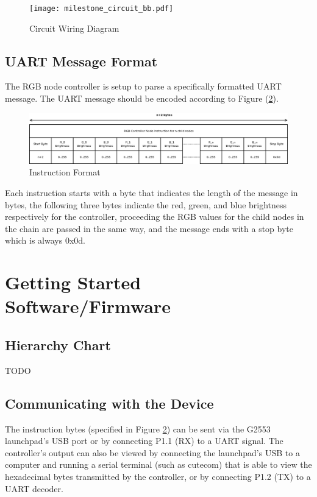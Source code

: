 \documentclass{hitec}
\begin{document}
\begin{figure}[H]
    \centering
    \texttt{[image: milestone\_circuit\_bb.pdf]}
    \caption{Circuit Wiring Diagram}
    \label{fig:circuit_bb}
\end{figure}


\subsection{UART Message Format}
The RGB node controller is setup to parse a specifically formatted UART message. The UART message should be encoded according to Figure (\ref{fig:instruction_format}).

\begin{figure}[H]
    \centering
    \includegraphics[scale=0.3]{instruction_format.png}
    \caption{Instruction Format}
    \label{fig:instruction_format}
\end{figure}

Each instruction starts with a byte that indicates the length of the message in bytes, the following three bytes indicate the red, green, and blue brightness respectively for the controller, proceeding the RGB values for the child nodes in the chain are passed in the same way, and the message ends with a stop byte which is always 0x0d.

\section{Getting Started Software/Firmware}

\subsection{Hierarchy Chart}
TODO

\subsection{Communicating with the Device}
The instruction bytes (specified in Figure \ref{fig:instruction_format}) can be sent via the G2553 launchpad's USB port or by connecting P1.1 (RX) to a UART signal. The controller's output can also be viewed by connecting the launchpad's USB to a computer and running a serial terminal (such as cutecom) that is able to view the hexadecimal bytes transmitted by the controller, or by connecting P1.2 (TX) to a UART decoder.
\end{document}

